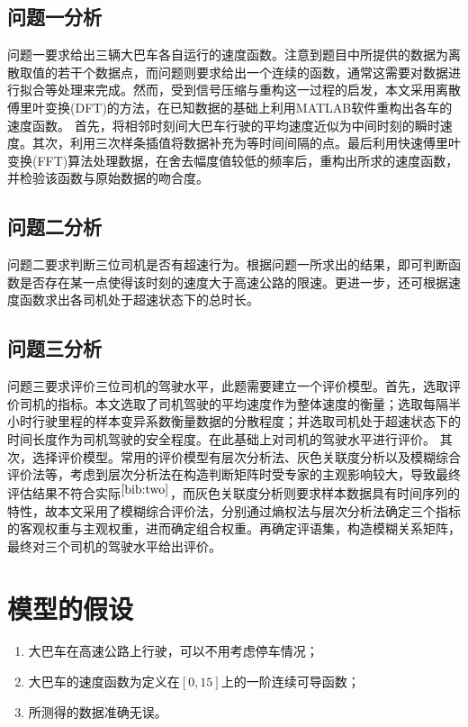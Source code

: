 \documentclass[bwprint]{cumcmthesis}
\begin{document}
        \subsection{问题一分析}
        问题一要求给出三辆大巴车各自运行的速度函数。注意到题目中所提供的数据为离散取值的若干个数据点，而问题则要求给出一个连续的函数，通常这需要对数据进行拟合等处理来完成。然而，受到信号压缩与重构这一过程的启发，本文采用离散傅里叶变换(DFT)的方法，在已知数据的基础上利用MATLAB软件重构出各车的速度函数。
        首先，将相邻时刻间大巴车行驶的平均速度近似为中间时刻的瞬时速度。其次，利用三次样条插值将数据补充为等时间间隔的点。最后利用快速傅里叶变换(FFT)算法处理数据，在舍去幅度值较低的频率后，重构出所求的速度函数，并检验该函数与原始数据的吻合度。

        \subsection{问题二分析}
        问题二要求判断三位司机是否有超速行为。根据问题一所求出的结果，即可判断函数是否存在某一点使得该时刻的速度大于高速公路的限速。更进一步，还可根据速度函数求出各司机处于超速状态下的总时长。
        \subsection{问题三分析}
        问题三要求评价三位司机的驾驶水平，此题需要建立一个评价模型。首先，选取评价司机的指标。本文选取了司机驾驶的平均速度作为整体速度的衡量；选取每隔半小时行驶里程的样本变异系数衡量数据的分散程度；并选取司机处于超速状态下的时间长度作为司机驾驶的安全程度。在此基础上对司机的驾驶水平进行评价。
        其次，选择评价模型。常用的评价模型有层次分析法、灰色关联度分析以及模糊综合评价法等，考虑到层次分析法在构造判断矩阵时受专家的主观影响较大，导致最终评估结果不符合实际$^{\cite{bib:two}}$，而灰色关联度分析则要求样本数据具有时间序列的特性，故本文采用了模糊综合评价法，分别通过熵权法与层次分析法确定三个指标的客观权重与主观权重，进而确定组合权重。再确定评语集，构造模糊关系矩阵，最终对三个司机的驾驶水平给出评价。
    \section{模型的假设}
        \begin{enumerate}
            \item 大巴车在高速公路上行驶，可以不用考虑停车情况；
            \item 大巴车的速度函数为定义在$[0,15]$上的一阶连续可导函数；
            \item 所测得的数据准确无误。
        \end{enumerate}
\end{document}
